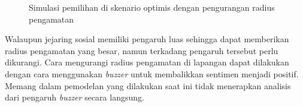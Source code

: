 \begin{figure}[H]
	\centering
	\hfill
	\hfill
	\caption{Simulasi pemilihan di skenario optimis dengan pengurangan radius pengamatan}
	\label{fig:simulasi_mesa_optimis_radius}
\end{figure}

Walaupun jejaring sosial memiliki pengaruh luas sehingga dapat memberikan radius pengamatan yang besar, namun terkadang pengaruh tersebut perlu dikurangi. Cara mengurangi radius pengamatan di lapangan dapat dilakukan dengan cara menggunakan \textit{buzzer} untuk membalikkan sentimen menjadi positif. Memang dalam pemodelan yang dilakukan saat ini tidak menerapkan analisis dari pengaruh \textit{buzzer} secara langsung.
